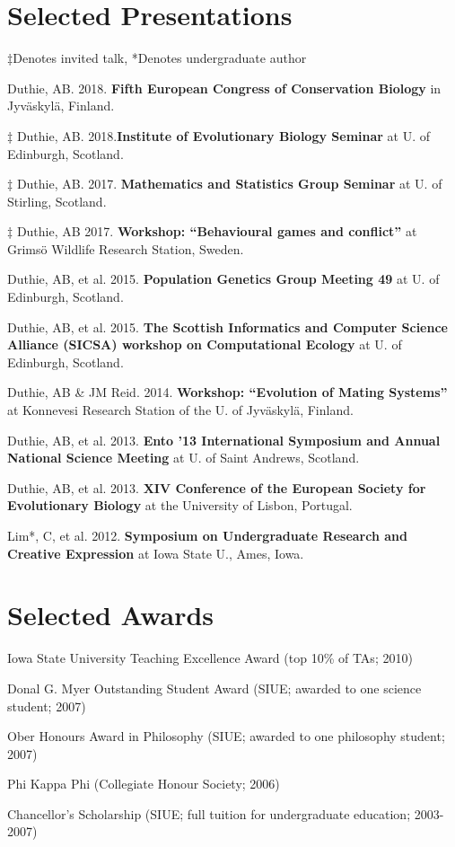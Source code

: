 \documentclass[letterpaper]{article}
\renewenvironment{itemize}{
  \begin{list}{}{
    \setlength{\leftmargin}{1.5em}
  }
}{
  \end{list}
}
\begin{document}
\begin{small}
\section*{Selected Presentations}
\begin{itemize}
\item $\ddagger$Denotes invited talk, *Denotes undergraduate author
\item Duthie, AB. 2018. {\bf Fifth European Congress of Conservation Biology} in Jyv\"{a}skyl\"{a}, Finland.
\item $\ddagger$ Duthie, AB. 2018.{\bf Institute of Evolutionary Biology Seminar} at U. of Edinburgh, Scotland.
\item $\ddagger$ Duthie, AB. 2017. {\bf Mathematics and Statistics Group Seminar} at U. of Stirling, Scotland.
\item $\ddagger$ Duthie, AB 2017. {\bf Workshop: ``Behavioural games and conflict''} at Grims\"{o} Wildlife Research Station, Sweden.
\item Duthie, AB, et al. 2015. {\bf Population Genetics Group Meeting 49} at U. of Edinburgh, Scotland.
\item Duthie, AB, et al. 2015. {\bf The Scottish Informatics and Computer Science Alliance (SICSA) workshop on Computational Ecology} at U. of Edinburgh, Scotland.
\item Duthie, AB \& JM Reid. 2014. {\bf Workshop: ``Evolution of Mating Systems''} at Konnevesi Research Station of the U. of Jyv\"{a}skyl\"{a}, Finland.
\item Duthie, AB, et al. 2013. {\bf Ento '13 International Symposium and Annual National Science Meeting} at U. of Saint Andrews, Scotland.
\item Duthie, AB, et al. 2013. {\bf XIV Conference of the European Society for Evolutionary Biology} at the University of Lisbon, Portugal.
\item Lim*, C, et al. 2012. {\bf Symposium on Undergraduate Research and Creative Expression} at Iowa State U., Ames, Iowa.



\end{itemize}

\section*{Selected Awards}
\begin{itemize}
\item Iowa State University Teaching Excellence Award (top 10\% of TAs; 2010)
\item Donal G. Myer Outstanding Student Award (SIUE; awarded to one science student; 2007)
\item Ober Honours Award in Philosophy (SIUE; awarded to one philosophy student; 2007)
\item Phi Kappa Phi (Collegiate Honour Society; 2006)
\item Chancellor's Scholarship (SIUE; full tuition for undergraduate education; 2003-2007)
\end{itemize}


\end{small}
\end{document}
